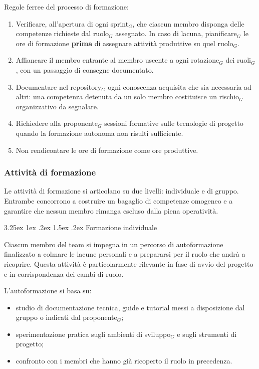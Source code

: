 \documentclass[a4paper, 10pt]{article}
\makeatletter
\renewcommand\paragraph{\@startsection{paragraph}{4}{\z@}%
  {3.25ex \@plus1ex \@minus .2ex}%
  {1.5ex \@plus .2ex}%
  {\normalfont\normalsize\bfseries}}
\makeatother
\begin{document}
\noindent Regole ferree del processo di formazione:
\begin{enumerate}
    \item Verificare, all'apertura di ogni sprint$_G$, che ciascun membro disponga delle competenze richieste dal ruolo$_G$ assegnato. In caso di lacuna, pianificare$_G$ le ore di formazione \textbf{prima} di assegnare attività produttive su quel ruolo$_G$.
    \item Affiancare il membro entrante al membro uscente a ogni rotazione$_G$ dei ruoli$_G$, con un passaggio di consegne documentato.
    \item Documentare nel repository$_G$ ogni conoscenza acquisita che sia necessaria ad altri: una competenza detenuta da un solo membro costituisce un rischio$_G$ organizzativo da segnalare.
    \item Richiedere alla proponente$_G$ sessioni formative sulle tecnologie di progetto quando la formazione autonoma non risulti sufficiente.
    \item Non rendicontare le ore di formazione come ore produttive.
\end{enumerate}

\subsubsection{Attività di formazione}
\label{subsubsec:attivita_formazione}

Le attività di formazione si articolano su due livelli: individuale e di gruppo. Entrambe concorrono a costruire un bagaglio di competenze omogeneo e a garantire che nessun membro rimanga escluso dalla piena operatività.

\paragraph{Formazione individuale}

Ciascun membro del team si impegna in un percorso di autoformazione finalizzato a colmare le lacune personali e a prepararsi per il ruolo che andrà a ricoprire. Questa attività è particolarmente rilevante in fase di avvio del progetto e in corrispondenza dei cambi di ruolo.

L'autoformazione si basa su:
\begin{itemize}
    \item studio di documentazione tecnica, guide e tutorial messi a disposizione dal gruppo o indicati dal proponente$_G$;
    \item sperimentazione pratica sugli ambienti di sviluppo$_G$ e sugli strumenti di progetto;
    \item confronto con i membri che hanno già ricoperto il ruolo in precedenza.
\end{itemize}
\end{document}
